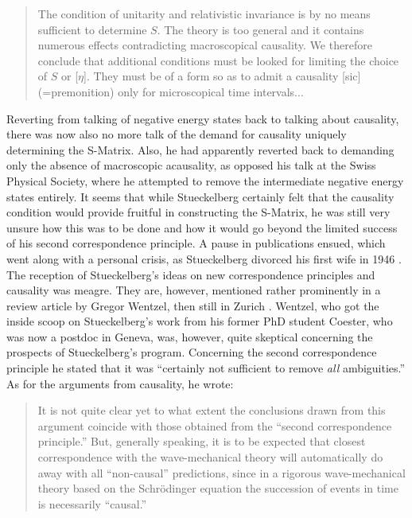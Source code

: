 \documentclass[12pt]{article}
\begin{document}
\begin{quote}
The condition of unitarity and relativistic invariance is by no means sufficient to determine $S$. The theory is too general and it contains numerous effects contradicting macroscopical causality. We therefore conclude that additional conditions must be looked for limiting the choice of $S$ or [$\eta$]. They must be of a form so as to admit a causality [sic] (=premonition) only for microscopical time intervals...
\end{quote}

Reverting from talking of negative energy states back to talking about causality, there was now also no more talk of the demand for causality uniquely determining the S-Matrix. Also, he had apparently reverted back to demanding only the absence of macroscopic acausality, as opposed his talk at the Swiss Physical Society, where he attempted to remove the intermediate negative energy states entirely. It seems that while Stueckelberg certainly felt that the causality condition would provide fruitful in constructing the S-Matrix, he was still very unsure how this was to be done and how it would go beyond the limited success of his second correspondence principle. A pause in publications ensued, which went along with a personal crisis, as Stueckelberg divorced his first wife in 1946 \citep[p. 143]{crease_1986_the-second}. The reception of Stueckelberg's ideas on new correspondence principles and causality was meagre. They are, however, mentioned rather prominently in a review article by Gregor Wentzel, then still in Zurich \citep{wentzel_1947_recent}. Wentzel, who got the inside scoop on Stueckelberg's work from his former PhD student Coester, who was now a postdoc in Geneva, was, however, quite skeptical concerning the prospects of Stueckelberg's program. Concerning the second correspondence principle he stated that it was ``certainly not sufficient to remove \emph{all} ambiguities.'' As for the arguments from causality, he wrote:

\begin{quote}
It is not quite clear yet to what extent the conclusions drawn from this argument coincide with those obtained from the ``second correspondence principle.'' But, generally speaking, it is to be expected that closest correspondence with the wave-mechanical theory will automatically do away with all ``non-causal'' predictions, since in a rigorous wave-mechanical theory based on the Schr\"{o}dinger equation the succession of events in time is necessarily ``causal.''
\end{quote}
\end{document}

